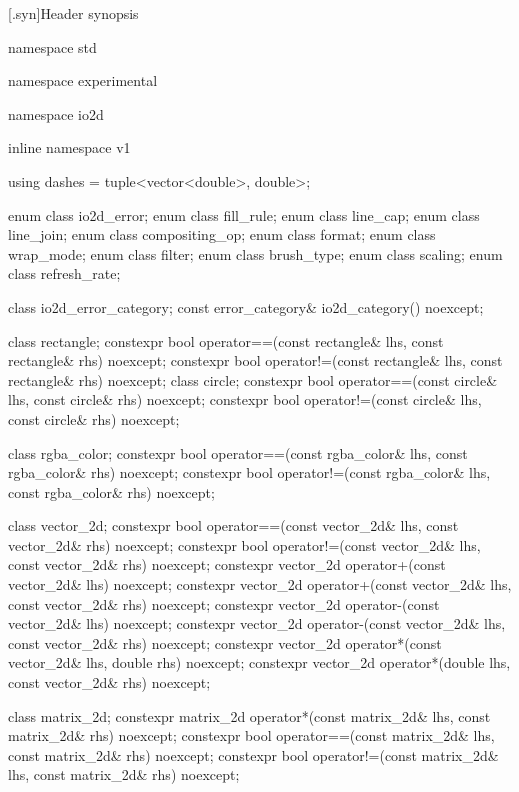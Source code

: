 [\iotwod.syn]{Header  synopsis}

%
%
\begin{codeblock}

namespace std { namespace experimental {
  namespace io2d { inline namespace v1 {

  using dashes = tuple<vector<double>, double>;

  enum class io2d_error;
  enum class fill_rule;
  enum class line_cap;
  enum class line_join;
  enum class compositing_op;
  enum class format;
  enum class wrap_mode;
  enum class filter;
  enum class brush_type;
  enum class scaling;
  enum class refresh_rate;

  class io2d_error_category;
  const error_category& io2d_category() noexcept;

  class rectangle;
  constexpr bool operator==(const rectangle& lhs, const rectangle& rhs) 
    noexcept;
  constexpr bool operator!=(const rectangle& lhs, const rectangle& rhs) 
    noexcept;
  class circle;
  constexpr bool operator==(const circle& lhs, const circle& rhs) noexcept;
  constexpr bool operator!=(const circle& lhs, const circle& rhs) noexcept;

  class rgba_color;
  constexpr bool operator==(const rgba_color& lhs, const rgba_color& rhs) 
    noexcept;
  constexpr bool operator!=(const rgba_color& lhs, const rgba_color& rhs) 
    noexcept;

  class vector_2d;
  constexpr bool operator==(const vector_2d& lhs, const vector_2d& rhs) 
    noexcept;
  constexpr bool operator!=(const vector_2d& lhs, const vector_2d& rhs) 
    noexcept;
  constexpr vector_2d operator+(const vector_2d& lhs) noexcept;
  constexpr vector_2d operator+(const vector_2d& lhs, const vector_2d& rhs) 
    noexcept;
  constexpr vector_2d operator-(const vector_2d& lhs) noexcept;
  constexpr vector_2d operator-(const vector_2d& lhs, const vector_2d& rhs) 
    noexcept;
  constexpr vector_2d operator*(const vector_2d& lhs, double rhs) noexcept;
  constexpr vector_2d operator*(double lhs, const vector_2d& rhs) noexcept;

  class matrix_2d;
  constexpr matrix_2d operator*(const matrix_2d& lhs, const matrix_2d& rhs) 
    noexcept;
  constexpr bool operator==(const matrix_2d& lhs, const matrix_2d& rhs) 
    noexcept;
  constexpr bool operator!=(const matrix_2d& lhs, const matrix_2d& rhs) 
    noexcept;

}}}}
\end{codeblock}

